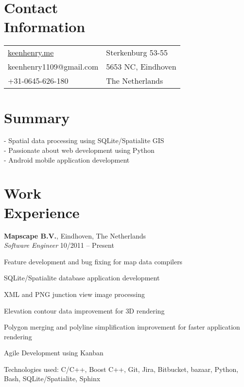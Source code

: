 \documentclass[margin,line]{resume}
\begin{document}
\begin{resume}

    \section{\myheadingstyle Contact \\ Information}
      \begin{tabular}{@{}p{7cm}p{6cm}}
      \url{keenhenry.me}      & Sterkenburg 53-55 \\
      keenhenry1109@gmail.com & 5653 NC, Eindhoven \\
      +31-0645-626-180        & The Netherlands \\
      \end{tabular}
 
    \section{\myheadingstyle Summary}
      - Spatial data processing using SQLite/Spatialite GIS \\
      - Passionate about web development using Python \\
      - Android mobile application development \\
    \vspace{-5mm}

    \section{\myheadingstyle Work \\ Experience}

    \textbf{Mapscape B.V.}, Eindhoven, The Netherlands \\
    \textsl{Software Engineer} \hfill 10/2011 -- Present \vspace{-3mm}\\\vspace{-1mm}%
      \begin{list2}
      \item Feature development and bug fixing for map data compilers
      \item SQLite/Spatialite database application development
      \item XML and PNG junction view image processing
      \item Elevation contour data improvement for 3D rendering
      \item Polygon merging and polyline simplification improvement for faster application rendering
      \item Agile Development using Kanban
      \item Technologies used: C/C++, Boost C++, Git, Jira, Bitbucket, bazaar, Python, Bash, SQLite/Spatialite, Sphinx
      \end{list2}


\end{resume}
\end{document}
